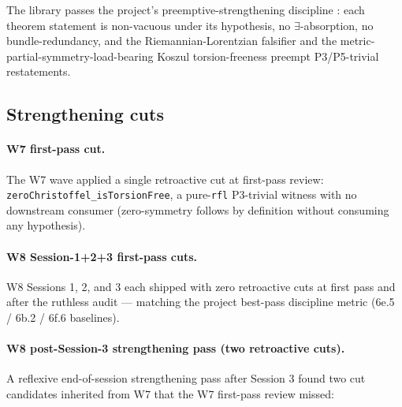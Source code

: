 \documentclass[twocolumn]{revtex4-2}
\begin{document}
The library passes the project's preemptive-strengthening discipline
\cite{Roehm2026Pipeline}: each theorem statement is non-vacuous under
its hypothesis, no $\exists$-absorption, no bundle-redundancy, and
the Riemannian-Lorentzian falsifier and the
metric-partial-symmetry-load-bearing Koszul torsion-freeness
preempt P3/P5-trivial restatements.

\subsection{Strengthening cuts}\label{sec:strengthening}

\paragraph{W7 first-pass cut.}
The W7 wave applied a single retroactive cut at first-pass review:
\texttt{zeroChristoffel\_isTorsionFree}, a pure-\texttt{rfl} P3-trivial
witness with no downstream consumer (zero-symmetry follows by
definition without consuming any hypothesis).

\paragraph{W8 Session-1+2+3 first-pass cuts.}
W8 Sessions 1, 2, and 3 each shipped with zero retroactive cuts at
first pass and after the ruthless audit — matching the project
best-pass discipline metric (6e.5 / 6b.2 / 6f.6 baselines).

\paragraph{W8 post-Session-3 strengthening pass (two retroactive cuts).}
A reflexive end-of-session strengthening pass after Session 3 found
two cut candidates inherited from W7 that the W7 first-pass review
missed:
\end{document}
